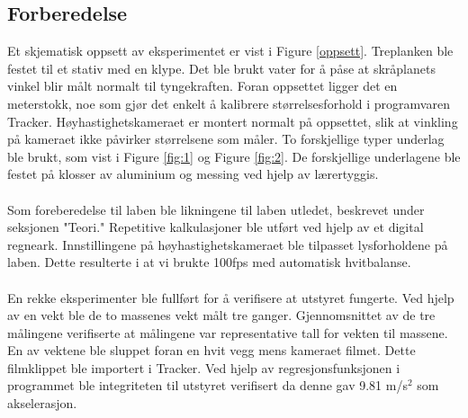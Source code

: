 \documentclass[10pt,a4paper]{report}
\begin{document}
\subsection*{Forberedelse}
Et skjematisk oppsett av eksperimentet er vist i Figure \ref{oppsett}. Treplanken ble festet til et stativ med en klype. Det ble brukt vater for å påse at skråplanets vinkel blir målt normalt til tyngekraften. Foran oppsettet ligger det en meterstokk, noe som gjør det enkelt å kalibrere størrelsesforhold i programvaren Tracker. Høyhastighetskameraet er montert normalt på oppsettet, slik at vinkling på kameraet ikke påvirker størrelsene som måler. To forskjellige typer underlag ble brukt, som vist i Figure \ref{fig:1} og Figure \ref{fig:2}. De forskjellige underlagene ble festet på klosser av aluminium og messing ved hjelp av lærertyggis.\\
\\Som foreberedelse til laben ble likningene til laben utledet, beskrevet under seksjonen "Teori." Repetitive kalkulasjoner ble utført ved hjelp av et digital regneark. Innstillingene på høyhastighetskameraet ble tilpasset lysforholdene på laben. Dette resulterte i at vi brukte 100fps med automatisk hvitbalanse.\\
\\En rekke eksperimenter ble fullført for å verifisere at utstyret fungerte. Ved hjelp av en vekt ble de to massenes vekt målt tre ganger. Gjennomsnittet av de tre målingene verifiserte at målingene var representative tall for vekten til massene. En av vektene ble sluppet foran en hvit vegg mens kameraet filmet. Dette filmklippet ble importert i Tracker. Ved hjelp av regresjonsfunksjonen i programmet ble integriteten til utstyret verifisert da denne gav 9.81 m/s$^2$ som akselerasjon.
\end{document}

